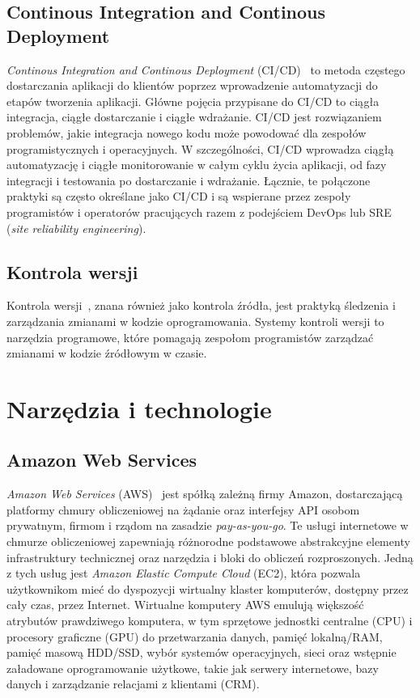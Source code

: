 	\subsection{Continous Integration and Continous Deployment}
	\textit{Continous Integration and Continous Deployment} (CI/CD)~\cite{ci} to metoda częstego dostarczania aplikacji do klientów poprzez wprowadzenie automatyzacji do etapów tworzenia aplikacji. Główne pojęcia przypisane do CI/CD to ciągła integracja, ciągłe dostarczanie i ciągłe wdrażanie. CI/CD jest rozwiązaniem problemów, jakie integracja nowego kodu może powodować dla zespołów programistycznych i operacyjnych.
	W szczególności, CI/CD wprowadza ciągłą automatyzację i ciągłe monitorowanie w całym cyklu życia aplikacji, od fazy integracji i testowania po dostarczanie i wdrażanie. Łącznie, te połączone praktyki są często określane jako CI/CD i są wspierane przez zespoły programistów i operatorów pracujących razem z podejściem DevOps lub SRE (\textit{site reliability engineering}).
	
	\subsection{Kontrola wersji}
	Kontrola wersji~\cite{version_control}, znana również jako kontrola źródła, jest praktyką śledzenia i zarządzania zmianami w kodzie oprogramowania. Systemy kontroli wersji to narzędzia programowe, które pomagają zespołom programistów zarządzać zmianami w kodzie źródłowym w czasie.


\section{Narzędzia i technologie}
	\subsection{Amazon Web Services}
	\textit{Amazon Web Services} (AWS)~\cite{aws} jest spółką zależną firmy Amazon, dostarczającą platformy chmury obliczeniowej na żądanie oraz interfejsy API osobom prywatnym, firmom i rządom na zasadzie \textit{pay-as-you-go}. Te usługi internetowe w chmurze obliczeniowej zapewniają różnorodne podstawowe abstrakcyjne elementy infrastruktury technicznej oraz narzędzia i bloki do obliczeń rozproszonych. Jedną z tych usług jest \textit{Amazon Elastic Compute Cloud} (EC2), która pozwala użytkownikom mieć do dyspozycji wirtualny klaster komputerów, dostępny przez cały czas, przez Internet. Wirtualne komputery AWS emulują większość atrybutów prawdziwego komputera, w tym sprzętowe jednostki centralne (CPU) i procesory graficzne (GPU) do przetwarzania danych, pamięć lokalną/RAM, pamięć masową HDD/SSD, wybór systemów operacyjnych, sieci oraz wstępnie załadowane oprogramowanie użytkowe, takie jak serwery internetowe, bazy danych i zarządzanie relacjami z klientami (CRM).
	
